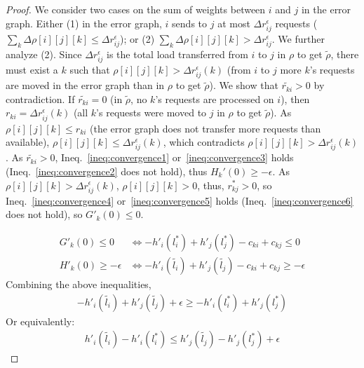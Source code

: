 \documentclass[11pt]{article}
\begin{document}
\begin{proof}
We consider two 
cases on the sum of weights between $i$ and $j$ in the error graph.
Either (1) in the error graph, $i$ sends to $j$ at most $\Delta r^{\epsilon}_{ij}$ requests ($\sum_k \Delta \rho[i][j][k] \leq \Delta r^{\epsilon}_{ij}$); or (2) 
$\sum_k \Delta \rho[i][j][k] > \Delta r^{\epsilon}_{ij}$. We further analyze (2). Since $\Delta r^{\epsilon}_{ij}$ is the total load transferred from $i$ to $j$ in $\rho$ to get $\tilde{\rho}$, there must exist a $k$ such that $\rho[i][j][k] > \Delta r^{\epsilon}_{ij}(k)$ (from $i$ to $j$ more $k$'s requests are moved in the error graph than in $\rho$ to get $\tilde{\rho}$). 
We show that $\tilde{r_{ki}} > 0$ by contradiction. 
If $\tilde{r_{ki}} = 0$ (in $\tilde{\rho}$, 
no $k$'s requests are processed on $i$), 
then $r_{ki} = \Delta r^{\epsilon}_{ij}(k)$ 
(all $k$'s requests were moved to $j$ in $\rho$ to get $\tilde{\rho}$).
As $\rho[i][j][k] \leq r_{ki}$ (the error graph does not transfer more requests than available),
$\rho[i][j][k] \leq \Delta r^{\epsilon}_{ij}(k)$, which contradicts $\rho[i][j][k] > \Delta r^{\epsilon}_{ij}(k)$.
As $\tilde{r_{ki}} > 0$,
Ineq.~\ref{ineq:convergence1} or~\ref{ineq:convergence3} holds (Ineq.~\ref{ineq:convergence2} does not hold),
thus $H_k'(0) \geq -\epsilon$.
As $\rho[i][j][k] > \Delta r^{\epsilon}_{ij}(k)$,
$\rho[i][j][k] > 0$,
thus, $r^*_{kj} > 0$,
so Ineq.~\ref{ineq:convergence4} or~\ref{ineq:convergence5} holds (Ineq.~\ref{ineq:convergence6} does not hold),
so $G'_k(0) \leq 0$.

\begin{align*}
G'_k(0) \leq 0 &\Leftrightarrow -h'_i(l^{*}_{i}) + h'_j(l^{*}_{j}) - c_{ki} + c_{kj}  \leq 0 \\
H'_k(0) \geq -\epsilon &\Leftrightarrow -h'_i(\tilde{l_{i}}) +  h'_j(\tilde{l_{j}}) - c_{ki} + c_{kj} \geq -\epsilon
\end{align*}
Combining the above inequalities,
\begin{align*}
-h'_i(\tilde{l_{i}}) +  h'_j(\tilde{l_{j}}) + \epsilon \geq -h'_i(l^{*}_{i}) + h'_j(l^{*}_{j})
\end{align*}
Or equivalently:
\begin{align}
h'_i(\tilde{l_{i}}) - h'_i(l^{*}_{i}) \leq h'_j(\tilde{l_{j}}) - h'_j(l^{*}_{j}) + \epsilon \label{ineq:relation-expanded2}
\end{align}


\end{proof}
\end{document}
